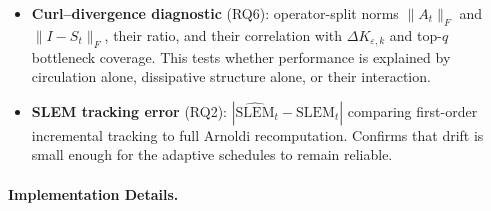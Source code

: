 \documentclass[10pt,a4paper]{article}
\begin{document}
\begin{itemize}
  \item \textbf{Curl--divergence diagnostic} (RQ6): operator-split norms $\|A_t\|_F$ and
    $\|I-S_t\|_F$, their ratio, and their correlation with $\Delta K_{\varepsilon,k}$ and top-$q$
    bottleneck coverage.
    This tests whether performance is explained by circulation alone, dissipative structure
    alone, or their interaction.

  \item \textbf{SLEM tracking error} (RQ2): $|\widehat{\mathrm{SLEM}}_t - \mathrm{SLEM}_t|$
    comparing first-order incremental tracking to full Arnoldi recomputation.
    Confirms that drift is small enough for the adaptive schedules to remain reliable.
\end{itemize}


\paragraph{Implementation Details.}
\end{document}
